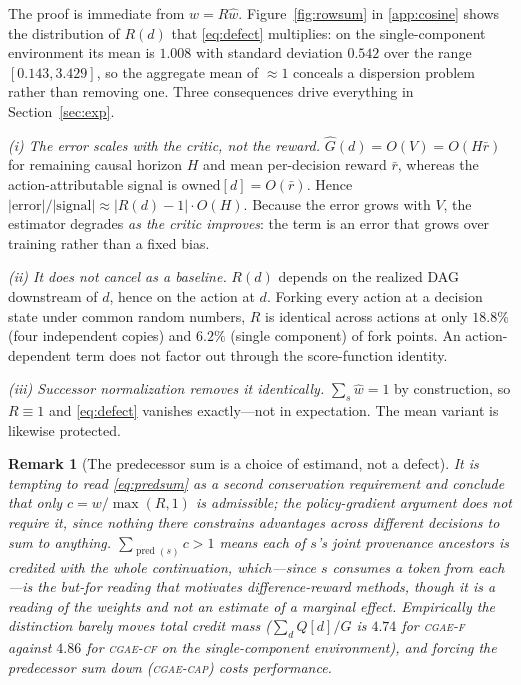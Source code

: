 \documentclass[review,authoryear,3p,times]{elsarticle}
\newtheorem{remark}{Remark}
\newcommand{\cflow}{\textsc{cgae-cf}}          %
\newcommand{\cflowraw}{\textsc{cgae-f}}        %
\newcommand{\ccap}{\textsc{cgae-cap}}          %
\newcommand{\pred}{\operatorname{pred}}
\begin{document}
\noindent The proof is immediate from $w = R\hat w$.
Figure~\ref{fig:rowsum} in \ref{app:cosine} shows the distribution of
$R(d)$ that \eqref{eq:defect} multiplies: on the single-component environment
its mean is $1.008$ with standard deviation $0.542$ over the range
$[0.143,3.429]$, so the aggregate mean of $\approx1$ conceals a dispersion
problem rather than removing one. Three consequences drive everything in
Section~\ref{sec:exp}.

\emph{(i) The error scales with the critic, not the reward.}
$\hat{G}(d)=O(V)=O(H\bar r)$ for remaining causal horizon $H$ and mean
per-decision reward $\bar r$, whereas the action-attributable signal is
$\mathrm{owned}[d]=O(\bar r)$. Hence
$|\text{error}|/|\text{signal}| \approx |R(d)-1|\cdot O(H)$. Because the error
grows with $V$, the estimator degrades \emph{as the critic improves}: the term
is an error that grows over training rather than a fixed bias.

\emph{(ii) It does not cancel as a baseline.} $R(d)$ depends on the realized DAG
downstream of $d$, hence on the action at $d$. Forking every action at a decision
state under common random numbers, $R$ is identical across actions at only
$18.8\%$ (four independent copies) and $6.2\%$ (single component) of fork points.
An action-dependent term does not factor out through the score-function identity.


\emph{(iii) Successor normalization removes it identically.}
$\sum_s\hat w=1$ by construction, so $R\equiv 1$ and \eqref{eq:defect} vanishes
exactly---not in expectation. The mean variant is likewise protected.

\begin{remark}[The predecessor sum is a choice of estimand, not a defect]
\label{rem:p}
It is tempting to read \eqref{eq:predsum} as a second conservation requirement
and conclude that only $c=w/\max(R,1)$ is admissible; the policy-gradient
argument does not require it, since nothing there constrains advantages across
\emph{different} decisions to sum to anything. $\sum_{\pred(s)}c>1$ means each
of $s$'s joint provenance ancestors is credited with the whole continuation,
which---since $s$ consumes a token from each---is the but-for reading that
motivates difference-reward methods, though it is a reading of the weights and
not an estimate of a marginal effect. Empirically the distinction barely moves
total credit mass ($\sum_d Q[d]/G$ is $4.74$ for \cflowraw{} against $4.86$ for
\cflow{} on the single-component environment), and forcing the predecessor sum
down (\ccap) costs performance.
\end{remark}
\end{document}
